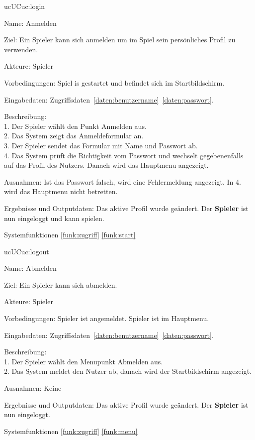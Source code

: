 \begin{description}[leftmargin=5em, style=sameline]
	\begin{lhp}{uc}{UC}{uc:login}
		\item [Name:] Anmelden
		\item [Ziel:] Ein Spieler kann sich anmelden um im Spiel sein persönliches Profil zu verwenden.
		\item [Akteure:] Spieler
		\item [Vorbedingungen:] Spiel is gestartet und befindet sich im Startbildschirm.
		\item [Eingabedaten:] Zugriffsdaten~\ref{daten:benutzername}~\ref{daten:passwort}.
		\item [Beschreibung:] \hfill\\
				1. Der Spieler wählt den Punkt Anmelden aus.\\
				2. Das System zeigt das Anmeldeformular an.\\
				3. Der Spieler sendet das Formular mit Name und Passwort ab.\\
				4. Das System prüft die Richtigkeit vom Passwort und wechselt gegebenenfalls auf das Profil des Nutzers. Danach wird das Hauptmenu angezeigt.\\
		\item [Ausnahmen:] Ist das Passwort falsch, wird eine Fehlermeldung angezeigt. In 4. wird das Hauptmenu nicht betretten.
		\item [Ergebnisse und Outputdaten:] Das aktive Profil wurde geändert. Der \textbf{Spieler} ist nun eingeloggt und kann spielen.
		\item [Systemfunktionen] \ref{funk:zugriff} \ref{funk:start}
	\end{lhp}

	\begin{lhp}{uc}{UC}{uc:logout}
		\item [Name:] Abmelden
		\item [Ziel:] Ein Spieler kann sich abmelden.
		\item [Akteure:] Spieler
		\item [Vorbedingungen:] Spieler ist angemeldet. Spieler ist im Hauptmenu.
		\item [Eingabedaten:] Zugriffsdaten~\ref{daten:benutzername}~\ref{daten:passwort}.
		\item [Beschreibung:] \hfill\\
				1. Der Spieler wählt den Menupunkt Abmelden aus.\\
				2. Das System meldet den Nutzer ab, danach wird der Startbildschirm angezeigt.\\
		\item [Ausnahmen:] Keine
		\item [Ergebnisse und Outputdaten:] Das aktive Profil wurde geändert. Der \textbf{Spieler} ist nun eingeloggt.
		\item [Systemfunktionen] \ref{funk:zugriff} \ref{funk:menu}
	\end{lhp}


\end{description}
